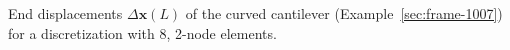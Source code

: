 %
\begin{center}
\begin{table}[H]%
\caption{End displacements \(\Delta \boldsymbol{x}(L)\) of the curved cantilever (Example~\ref{sec:frame-1007}) for a discretization with 8, 2-node  elements.}
\label{tab:bathe}

\end{table}
\end{center}

